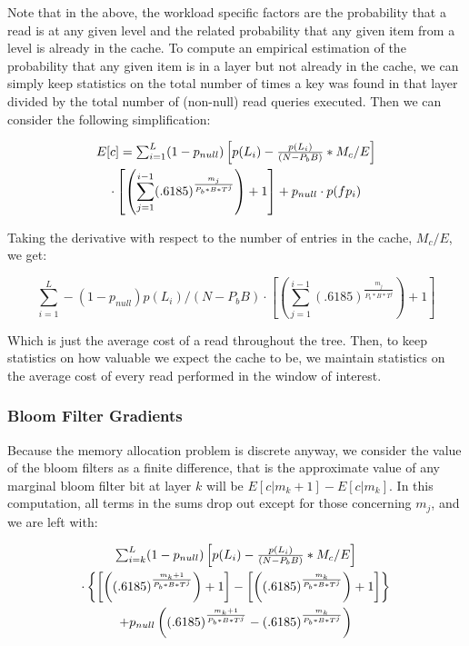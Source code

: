 \documentclass{cidr-2019}
\begin{document}
Note that in the above, the workload specific factors are the probability that
a read is at any given level and the related probability that any given item
from a level is already in the cache. To compute an empirical estimation of the
probability that any given item is in a layer but not already in the cache, we
can simply keep statistics on the total number of times a key was found in that
layer divided by the total number of (non-null) read queries executed. Then we
can consider the following simplification:

\begin{multline}
$$E[c] = \sum_{i=1}^{L} (1-p_{null})\left[p(L_i) - \frac{p(L_i)}{(N - P_bB)} * M_c/E \right]\\ \cdot \left[ \left(\sum_{j=1}^{i-1} (.6185) ^  {\frac{m_j}{P_b*B*T^j}}\right) +1 \right] + p_{null} \cdot p(fp_i) $$
\end{multline}

Taking the derivative with respect to the number of entries in the cache,
$M_c/E$, we get:

$$
\sum_{i=1}^{L}  -(1-p_{null}) p(L_i)/(N - P_bB) \cdot \left[ \left(\sum_{j=1}^{i-1} (.6185) ^  {\frac{m_j}{P_b*B*T^j}}\right) +1 \right]
$$

Which is just the average cost of a read throughout the tree. Then, to keep
statistics on how valuable we expect the cache to be, we maintain statistics on
the average cost of every read performed in the window of interest.

\subsubsection{Bloom Filter Gradients}

Because the memory allocation problem is discrete anyway, we consider the value
of the bloom filters as a finite difference, that is the approximate value of
any marginal bloom filter bit at layer $k$ will be $E[c | m_k+1] - E[c | m_k]$.
In this computation, all terms in the sums drop out except for those concerning
$m_j$, and we are left with:

\begin{multline}
$$\sum_{i=k}^{L} (1-p_{null})\left[p(L_i) - \frac{p(L_i)}{(N - P_bB)} * M_c/E \right] \\ \cdot \left\{ \left[ \left( (.6185) ^  {\frac{m_k+1}{P_b*B*T^j}}\right) +1 \right] - \left[ \left( (.6185) ^  {\frac{m_k}{P_b*B*T^j}}\right) +1 \right] \right\} \\+ p_{null}  \left( (.6185) ^  {\frac{m_k+1}{P_b*B*T^j}} - (.6185) ^  {\frac{m_k}{P_b*B*T^j}}\right)$$
\end{multline}
\end{document}
